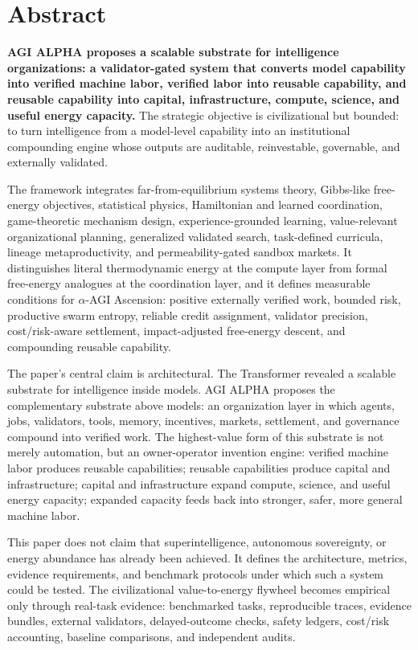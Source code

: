 \documentclass[11pt]{article}
\begin{document}
\section{Abstract}\label{abstract}

\textbf{AGI ALPHA proposes a scalable substrate for intelligence organizations: a validator-gated system that converts model capability into verified machine labor, verified labor into reusable capability, and reusable capability into capital, infrastructure, compute, science, and useful energy capacity.} The strategic objective is civilizational but bounded: to turn intelligence from a model-level capability into an institutional compounding engine whose outputs are auditable, reinvestable, governable, and externally validated.

The framework integrates far-from-equilibrium systems theory, Gibbs-like free-energy objectives, statistical physics, Hamiltonian and learned coordination, game-theoretic mechanism design, experience-grounded learning, value-relevant organizational planning, generalized validated search, task-defined curricula, lineage metaproductivity, and permeability-gated sandbox markets. It distinguishes literal thermodynamic energy at the compute layer from formal free-energy analogues at the coordination layer, and it defines measurable conditions for $\alpha$-AGI Ascension: positive externally verified work, bounded risk, productive swarm entropy, reliable credit assignment, validator precision, cost/risk-aware settlement, impact-adjusted free-energy descent, and compounding reusable capability.

The paper's central claim is architectural. The Transformer revealed a scalable substrate for intelligence inside models. AGI ALPHA proposes the complementary substrate above models: an organization layer in which agents, jobs, validators, tools, memory, incentives, markets, settlement, and governance compound into verified work. The highest-value form of this substrate is not merely automation, but an owner-operator invention engine: verified machine labor produces reusable capabilities; reusable capabilities produce capital and infrastructure; capital and infrastructure expand compute, science, and useful energy capacity; expanded capacity feeds back into stronger, safer, more general machine labor.

This paper does not claim that superintelligence, autonomous sovereignty, or energy abundance has already been achieved. It defines the architecture, metrics, evidence requirements, and benchmark protocols under which such a system could be tested. The civilizational value-to-energy flywheel becomes empirical only through real-task evidence: benchmarked tasks, reproducible traces, evidence bundles, external validators, delayed-outcome checks, safety ledgers, cost/risk accounting, baseline comparisons, and independent audits.
\end{document}
